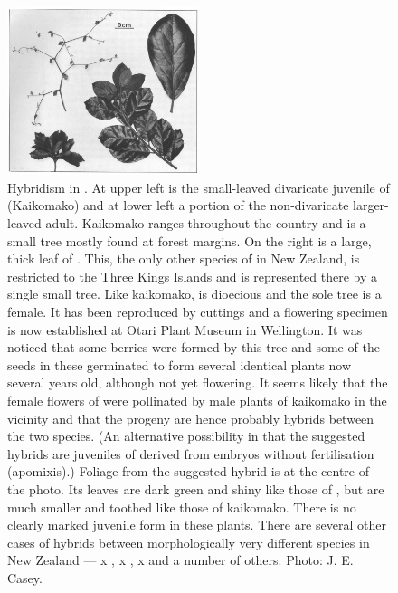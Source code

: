 \begin{figure}
	\includegraphics[width=0.5\textwidth]{graphics/figure79pennantia.jpg}
	\centering
	\caption[Hybridism in Pennantia]{Hybridism in .
	At upper left is the small-leaved divaricate juvenile of  (Kaikomako) and at lower left a portion of the non-divaricate larger-leaved adult.
	Kaikomako ranges throughout the country and is a small tree mostly found at forest margins.
	On the right is a large, thick leaf of .
	This, the only other species of  in New Zealand, is restricted to the Three Kings Islands and is represented there by a single small tree.
	Like kaikomako,  is dioecious and the sole tree is a female.
	It has been reproduced by cuttings and a flowering specimen is now established at Otari Plant Museum in Wellington.
	It was noticed that some berries were formed by this tree and some of the seeds in these germinated to form several identical plants now several years old, although not yet flowering.
	It seems likely that the female flowers of  were pollinated by male plants of kaikomako in the vicinity and that the progeny are hence probably hybrids between the two species. (An alternative possibility in that the suggested hybrids are juveniles of  derived from embryos without fertilisation (apomixis).) Foliage from the suggested hybrid is at the centre of the photo.
	Its leaves are dark green and shiny like those of , but are much smaller and toothed like those of kaikomako.
	There is no clearly marked juvenile form in these plants.
	There are several other cases of hybrids between morphologically very different species in New Zealand ---  x ,  x ,  x  and a number of others.
	Photo:  J. E. Casey.}%
	\label{fig:79pennantia}
\end{figure}

